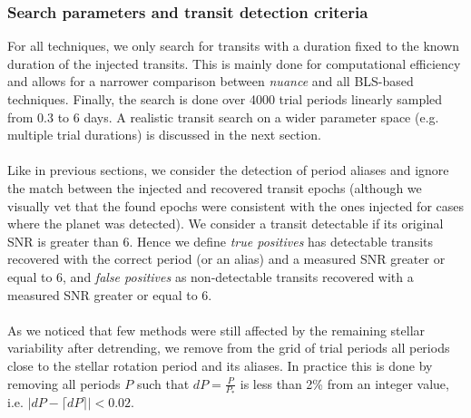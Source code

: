 \documentclass[modern]{aastex631}
\newcommand{\nuancemethod}{\textit{nuance}}
\begin{document}
\subsubsection*{Search parameters and transit detection criteria}
For all techniques, we only search for transits with a duration fixed to the known duration of the injected transits. This is mainly done for computational efficiency and allows for a narrower comparison between \nuancemethod{} and all BLS-based techniques. Finally, the search is done over 4000 trial periods linearly sampled from 0.3 to 6 days. A realistic transit search on a wider parameter space (e.g. multiple trial durations) is discussed in the next section.\\\\
Like in previous sections, we consider the detection of period aliases and ignore the match between the injected and recovered transit epochs (although we visually vet that the found epochs were consistent with the ones injected for cases where the planet was detected). We consider a transit detectable if its original SNR is greater than 6. Hence we define \textit{true positives} has detectable transits recovered with the correct period (or an alias) and a measured SNR greater or equal to 6, and \textit{false positives} as non-detectable transits recovered with a measured SNR greater or equal to 6.\\\\As we noticed that few methods were still affected by the remaining stellar variability after detrending, we remove from the grid of trial periods all periods close to the stellar rotation period and its aliases. In practice this is done by removing all periods $P$ such that $dP = \frac{P}{P_*}$ is less than 2\% from an integer value, i.e. $\vert  dP - \lceil dP \rceil \vert < 0.02$.

\newpage
\end{document}
